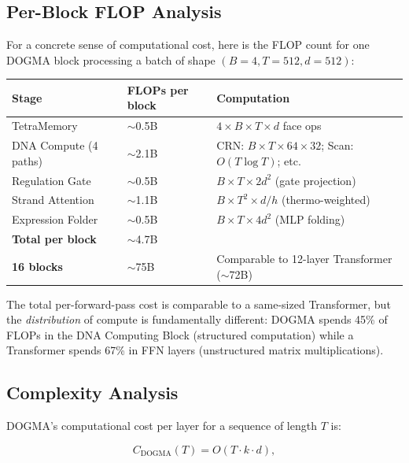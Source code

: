 \subsection{Per-Block FLOP Analysis}

For a concrete sense of computational cost, here is the FLOP count for one DOGMA block processing a batch of shape $(B{=}4, T{=}512, d{=}512)$:

\begin{center}
\renewcommand{\arraystretch}{1.15}
\begin{tabularx}{0.95\textwidth}{L{4cm} C{3cm} Y}
\toprule
\textbf{Stage} & \textbf{FLOPs per block} & \textbf{Computation} \\
\midrule
TetraMemory & $\sim$0.5B & $4 \times B \times T \times d$ face ops \\
DNA Compute (4 paths) & $\sim$2.1B & CRN: $B \times T \times 64 \times 32$; Scan: $O(T \log T)$; etc. \\
Regulation Gate & $\sim$0.5B & $B \times T \times 2d^2$ (gate projection) \\
Strand Attention & $\sim$1.1B & $B \times T^2 \times d / h$ (thermo-weighted) \\
Expression Folder & $\sim$0.5B & $B \times T \times 4d^2$ (MLP folding) \\
\midrule
\textbf{Total per block} & $\sim$4.7B & \\
\textbf{16 blocks} & $\sim$75B & Comparable to 12-layer Transformer ($\sim$72B) \\
\bottomrule
\end{tabularx}
\end{center}

The total per-forward-pass cost is comparable to a same-sized Transformer, but the \emph{distribution} of compute is fundamentally different: DOGMA spends 45\% of FLOPs in the DNA Computing Block (structured computation) while a Transformer spends 67\% in FFN layers (unstructured matrix multiplications).

\subsection{Complexity Analysis}

DOGMA's computational cost per layer for a sequence of length $T$ is:

\begin{equation}
C_{\text{DOGMA}}(T) = O(T \cdot k \cdot d),
\label{eq:dogma-complexity}
\end{equation}


